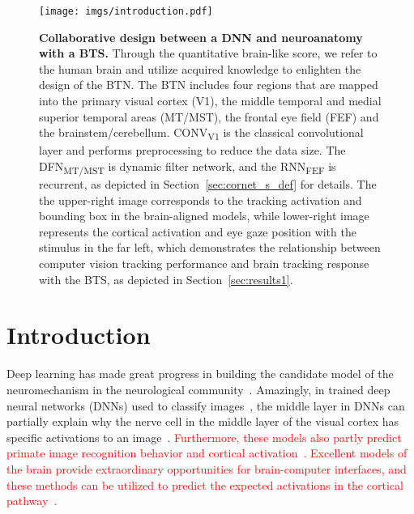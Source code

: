 \documentclass[final,3p,times,twocolumn]{elsarticle}
\begin{document}
\begin{figure*}
	\centering
	\texttt{[image: imgs/introduction.pdf]}
	\caption{
		\textbf{
		Collaborative design between a DNN and neuroanatomy with a BTS.} 
		Through the quantitative brain-like score, we refer to the human brain and utilize acquired knowledge to enlighten the design of the BTN. 
		The BTN includes four regions that are mapped into the 		primary visual cortex (V1), 
		the middle temporal and medial superior temporal areas (MT/MST), the frontal eye field (FEF) and the brainstem/cerebellum. 
		CONV\textsubscript{V1} is the classical convolutional layer and performs preprocessing to reduce the data size.
		The DFN\textsubscript{MT/MST} is dynamic filter network, and the RNN\textsubscript{FEF} is recurrent, as depicted in Section~\ref{sec:cornet_s_def} for details.
		The the upper-right image corresponds to the tracking activation and bounding box in the brain-aligned models, 
		while lower-right image represents the cortical activation and eye gaze position with the stimulus in the far left,
		which demonstrates the relationship between computer vision tracking performance and brain tracking response with the BTS, as depicted in Section~\ref{sec:results1}.
	}
	\label{fig:introduction}
\end{figure*}


\section{Introduction}{D}{eep} learning has made great progress in building the candidate model of the neuromechanism in the neurological community~\cite{kubilius2019brain-like}. 
Amazingly, in trained deep neural networks (DNNs) used to classify images~\cite{Deng2009ImageNet}, the middle layer in DNNs can partially explain why the nerve cell in the middle layer of the visual cortex has specific activations to an image~\cite{yamins2014performance,khaligh2014deep,gucclu2015deep,murugesan2017brain,cichy2016deep,yamins2016using}. 
\textcolor{red}{
Furthermore, these models also partly predict primate image recognition behavior and cortical activation~\cite{rajalingham2018large,kubilius2016deep}.
Excellent models of the brain provide extraordinary opportunities for brain-computer interfaces,
and these methods can be utilized to predict the expected activations in the cortical pathway~\cite{bashivan2019neural}.}
\end{document}
